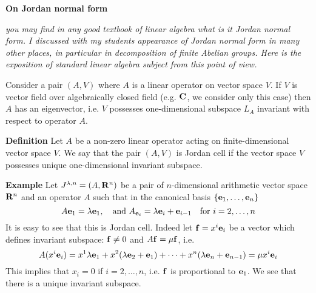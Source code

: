 

\def\p{\partial}
\def\t {\tilde}
\def \m {\medskip}
\def\degree {{\bf {\rm degree}\,\,}}
\def \finish {${\,\,\vrule height1mm depth2mm width 8pt}$}





\def\a {\alpha}
\def\vare{{\varepsilon}}
\def\l {\lambda}
\def\s {{\sigma}}

\def\G {{\Gamma}}

\def\A {{\bf A}}
\def\C {{\bf C}}
\def\E  {{\bf E}}
\def\K {{\bf K}}
\def\N {{\bf N}}
\def\Q {{\bf Q}}
\def\R  {{\bf R}}
\def\V {{\cal V}}
\def \X   {{\bf X}}
\def \Y   {{\bf Y}}
\def\Z {{\bf Z}}



\def\ac {{\bf a}}
\def\e{{\bf e}}
\def\f {{\bf f}}
\def\n {{\bf n}}
\def\r {{\bf r}}
\def\v {{\bf v}}
\def \x   {{\bf x}}
\def \y   {{\bf y}}


\def\pt {{\bf pt}}



\centerline {\bf On Jordan normal form}

  {\it you may find in any good textbook of linear algebra 
what is it Jordan normal form.
  I discussed with my students appearance of Jordan normal form 
in many other places, in
  particular in decomposition of finite Abelian groups. 
Here is the exposition of standard linear algebra subject from 
this point of view. }


\medskip

Consider a pair $(A,V)$ where $A$ is a linear operator on vector space
 $V$. If $V$ is vector field over algebraically closed field
(e.g. $\C$, we consider only this case) 
then $A$ has an eigenvector, i.e. $V$ possesses 
one-dimensional subspace $L_A$ invariant with respect to operator $A$.


{\bf Definition} Let $A$ be a non-zero linear operator acting on 
finite-dimensional vector space $V$.
We say that the pair $(A,V)$ is Jordan cell  if  the vector 
space $V$ possesses unique 
one-dimensional invariant subspace.

\m

\m

{\bf Example} Let $J^{\lambda,n}=(A,\R^n)$ be a pair of 
$n$-dimensional arithmetic vector space
$\R^n$ and an operator $A$ such that in the canonical basis 
$\{\e_1,\dots,\e_n\}$
                          $$
   A\e_1=\l\e_1,\quad {\rm and}\,\, A_{\e_i}=\lambda\e_i+\e_{i-1}\quad
   \hbox {for $i=2,\dots,n$}
                       $$
   It is easy to see that this is Jordan cell. Indeed let 
$\f=x^i\e_i$ be a vector which defines
   invariant subspace: $\f\not=0$ and $A\f=\mu \f$, i.e.
                   $$
   A(x^i\e_i)=x^1\l\e_1+x^2(\l \e_2+\e_1)+\dots+x^n(\l\e_n+\e_{n-1})=\mu x^i\e_i
      $$
 This implies that $x_i=0$ if $i=2,\dots,n$, i.e. $\f$ 
is proportional to $\e_1$. We see that there is a unique invariant subspace.



